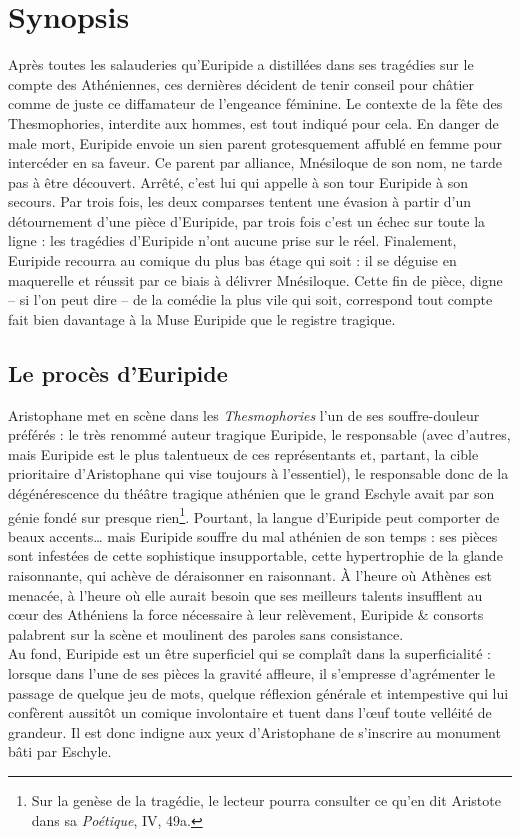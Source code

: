 \documentclass{book}%
\newcommand{\italique}[1]{\textit{#1}}%
\newcommand{\Partie}[1]{\section*{#1}%
\addcontentsline{toc}{section}{#1}}
\newcommand{\sousPartie}[1]{\subsection*{#1}}%
\newcommand{\note}[1]{\footnote{#1}}
\begin{document}
\Partie{Synopsis}
Après toutes les salauderies qu’Euripide a distillées dans ses tragédies sur le compte des Athéniennes, ces dernières décident de tenir conseil pour châtier comme de juste ce diffamateur de l’engeance féminine. Le contexte de la fête des Thesmophories, interdite aux hommes, est tout indiqué pour cela. En danger de male mort, Euripide envoie un sien parent grotesquement affublé en femme pour intercéder en sa faveur. Ce parent par alliance, Mnésiloque de son nom, ne tarde pas à être découvert. Arrêté, c’est lui qui appelle à son tour Euripide à son secours. Par trois fois, les deux comparses tentent une évasion à partir d’un détournement d’une pièce d’Euripide, par trois fois c’est un échec sur toute la ligne : les tragédies d’Euripide n’ont aucune prise sur le réel. Finalement, Euripide recourra au comique du plus bas étage qui soit : il se déguise en maquerelle et réussit par ce biais à délivrer Mnésiloque. Cette fin de pièce, digne – si l’on peut dire – de la comédie la plus vile qui soit, correspond tout compte fait bien davantage à la Muse Euripide que le registre tragique. 
\sousPartie{Le procès d’Euripide}
Aristophane met en scène dans les \italique{Thesmophories} l’un de ses souffre-douleur préférés : le très renommé auteur tragique Euripide, le responsable (avec d’autres, mais Euripide est le plus talentueux de ces représentants et, partant, la cible prioritaire d’Aristophane qui vise toujours à l’essentiel), le responsable donc de la dégénérescence du théâtre tragique athénien que le grand Eschyle avait par son génie fondé sur presque rien\note{Sur la genèse de la tragédie, le lecteur pourra consulter ce qu’en dit Aristote dans sa \italique{Poétique}, IV, 49a.}. Pourtant, la langue d’Euripide peut comporter de beaux accents… mais Euripide souffre du mal athénien de son temps : ses pièces sont infestées de cette sophistique insupportable, cette hypertrophie de la glande raisonnante, qui achève de déraisonner en raisonnant. À l’heure où Athènes est menacée, à l’heure où elle aurait besoin que ses meilleurs talents insufflent au cœur des Athéniens la force nécessaire à leur relèvement, Euripide \& consorts palabrent sur la scène et moulinent des paroles sans consistance. \\
Au fond, Euripide est un être superficiel qui se complaît dans la superficialité : lorsque dans l’une de ses pièces la gravité affleure, il s’empresse d’agrémenter le passage de quelque jeu de mots, quelque réflexion générale et intempestive qui lui confèrent aussitôt un comique involontaire et tuent dans l’œuf toute velléité de grandeur. Il est donc indigne aux yeux d’Aristophane de s’inscrire au monument bâti par Eschyle. 
\end{document}
